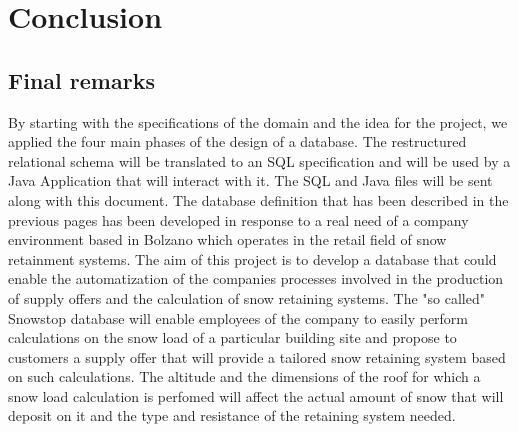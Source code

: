 
\section{Conclusion}

\subsection{Final remarks}
By starting with the specifications of the domain and the idea for the project, we applied the four main phases of the design of a database. The restructured relational schema will be translated to an SQL specification and will be used by a Java Application that will interact with it. The SQL and Java files will be sent along with this document.\newline\newline
The database definition that has been described in the previous pages has been developed in response to a real need of a company environment based in Bolzano which operates in the retail field of snow retainment systems.
\newline\newline
The aim of this project is to develop a database that could enable the automatization of the companies processes involved in the production of supply offers and the calculation of snow retaining systems. The "so called" Snowstop database will enable employees of the company to easily perform calculations on the snow load of a particular building site and propose to customers a supply offer that will provide a tailored snow retaining system based on such calculations. The altitude and the dimensions of the roof for which a snow load calculation is perfomed will affect the actual amount of snow that will deposit on it and the type and resistance of the retaining system needed.